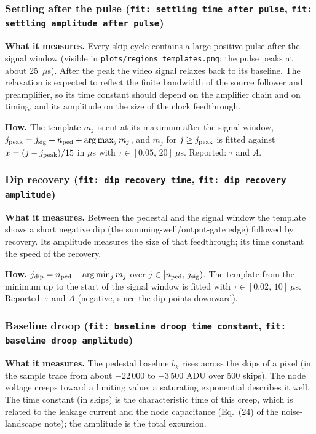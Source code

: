 \documentclass[11pt]{article}
\newcommand{\code}[1]{\texttt{#1}}
\begin{document}
\subsubsection{Settling after the pulse (\code{fit: settling time after pulse}, \code{fit: settling amplitude after pulse})}

\textbf{What it measures.} Every skip cycle contains a large positive pulse after the signal window
(visible in \code{plots/regions\_templates.png}: the pulse peaks at about 25~$\mu$s). After the peak the
video signal relaxes back to its baseline. The relaxation is expected to reflect the finite bandwidth
of the source follower and preamplifier, so its time constant should depend on the amplifier chain and
on timing, and its amplitude on the size of the clock feedthrough.

\textbf{How.} The template $m_j$ is cut at its maximum after the signal window,
$j_{\rm peak} = j_{\rm sig}+n_{\rm ped}+\arg\max_j m_j$, and $m_j$ for $j\ge j_{\rm peak}$ is fitted against
$x=(j-j_{\rm peak})/15$ in $\mu$s with $\tau\in[0.05,\,20]\ \mu$s. Reported: $\tau$ and $A$.

\subsubsection{Dip recovery (\code{fit: dip recovery time}, \code{fit: dip recovery amplitude})}

\textbf{What it measures.} Between the pedestal and the signal window the template shows a short
negative dip (the summing-well/output-gate edge) followed by recovery. Its amplitude measures the size of
that feedthrough; its time constant the speed of the recovery.

\textbf{How.} $j_{\rm dip} = n_{\rm ped}+\arg\min_j m_j$ over $j\in[n_{\rm ped},\,j_{\rm sig})$. The template from the
minimum up to the start of the signal window is fitted with $\tau\in[0.02,\,10]\ \mu$s. Reported: $\tau$ and
$A$ (negative, since the dip points downward).

\subsubsection{Baseline droop (\code{fit: baseline droop time constant}, \code{fit: baseline droop amplitude})}

\textbf{What it measures.} The pedestal baseline $b_k$ rises across the skips of a pixel (in the sample trace
from about $-22\,000$ to $-3\,500$ ADU over 500 skips). The node voltage creeps toward a limiting value; a
saturating exponential describes it well. The time constant (in skips) is the characteristic time of this
creep, which is related to the leakage current and the node capacitance (Eq.~(24) of the noise-landscape
note); the amplitude is the total excursion.
\end{document}
